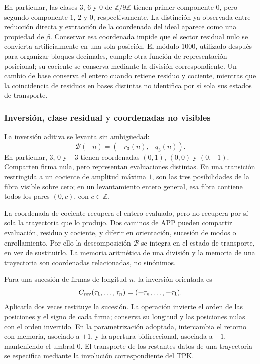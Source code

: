 En particular, las clases \(3\), \(6\) y \(0\) de
\(\mathbb Z/9\mathbb Z\) tienen primer componente \(0\), pero segundo
componente \(1\), \(2\) y \(0\), respectivamente. La distinción ya observada
entre reducción directa y extracción de la coordenada del ideal aparece
como una propiedad de \(\beta\). Conservar esa coordenada impide que el
sector residual nulo se convierta artificialmente en una sola posición.
El módulo \(1000\), utilizado después para organizar bloques decimales,
cumple otra función de representación posicional; su cociente se conserva
mediante la división correspondiente. Un cambio de base conserva el entero
cuando retiene residuo y cociente, mientras que la coincidencia de residuos
en bases distintas no identifica por sí sola sus estados de transporte.

\subsubsection{Inversión, clase residual y coordenadas no visibles}
\label{trit-ampl-inversion}

La inversión aditiva se levanta sin ambigüedad:
\[
 \mathcal B(-n)=(-r_3(n),-q_3(n)).
\]
En particular, \(3\), \(0\) y \(-3\) tienen coordenadas
\((0,1)\), \((0,0)\) y \((0,-1)\). Comparten firma nula, pero representan
evaluaciones distintas. En una transición restringida a un cociente de
amplitud máxima \(1\), son las tres posibilidades de la fibra visible sobre
cero; en un levantamiento entero general, esa fibra contiene todos los pares
\((0,c)\), con \(c\in\mathbb Z\).

La coordenada de cociente recupera el entero evaluado, pero no recupera por
sí sola la trayectoria que lo produjo. Dos caminos de APP pueden compartir
evaluación, residuo y cociente, y diferir en orientación, sucesión de modos o
enrollamiento. Por ello la descomposición \(\mathcal B\) se integra en el
estado de transporte, en vez de sustituirlo. La memoria aritmética de una
división y la memoria de una trayectoria son coordenadas relacionadas, no
sinónimos.

Para una sucesión de firmas de longitud \(n\), la inversión orientada es
\[
 C_{\rm rev}(\tau_1,\ldots,\tau_n)
   =(-\tau_n,\ldots,-\tau_1).
\]
Aplicarla dos veces restituye la sucesión. La operación invierte el orden de
las posiciones y el signo de cada firma; conserva su longitud y las
posiciones nulas con el orden invertido. En la parametrización adoptada,
intercambia el retorno con memoria, asociado a \(+1\), y la apertura
bidireccional, asociada a \(-1\), manteniendo el umbral \(0\). El transporte
de los restantes datos de una trayectoria se especifica mediante la
involución correspondiente del TPK.

